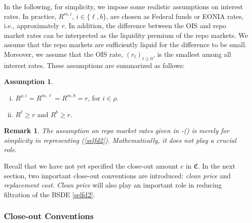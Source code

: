 \documentclass[a4paper, 11pt]{article}              %
\numberwithin{equation}{section}
\theoremstyle{plain}
\newcommand{\1}{\mathds{1}}
\newcommand{\frC}{\mathfrak{C}}
\theoremstyle{plain}
\newtheorem{assumption}[thm]{Assumption}
\theoremstyle{definition}
\newtheorem{remark}[thm]{Remark} %
\newtheorem{assumption}{Assumption}
\theoremstyle{plain}
\newtheorem{remark}{Remark}
\newcommand{\rom}[1]{\lowercase\expandafter{\romannumeral #1\relax}}
\begin{document}
In the following, for simplicity, we impose some realistic assumptions on
interest rates. In practice, $R^{m, i}$, $i \in \{\ell, b\}$, are chosen as Federal
funds or EONIA rates, i.e., approximately $r$. In addition, the difference between the
OIS
and repo market rates can be interpreted as the liquidity premium of the repo
markets.  We assume that the repo markets are sufficiently liquid for the difference to be
small. Moreover, we assume that the OIS rate, $(r_t)_{t\geq0}$, is the smallest among
all interest rates. 
These assumptions are summarized as follows:
\begin{assumption}\label{assm:rate.exo}
\begin{enumerate}[(i)]
\item $R^{\rho, i} = R^{m, \ell} =R^{m, b}= r$, for $i \in \rho$.
\item $R^\ell \geq r$ and $R^b\geq r$.
\end{enumerate}
\end{assumption}
\begin{remark}
The assumption on repo market rates given in -(\rom{1}) is  
merely for simplicity in representing (\ref{selfd2}). Mathematically, it does
not play a  crucial role.
\end{remark}
Recall that we have not yet specified the close-out amount $e$ in
$\frC$. In the next section, two important close-out conventions are introduced:
\textit{clean price} and \textit{replacement cost}. \textit{Clean price} will
also play an important role in reducing filtration of the BSDE \cref{selfd2}.
\subsubsection{Close-out Conventions}
% 
\iffalse
\label{sec:close}
The close-out amount is calculated by a determining party which will act in good
faith \citep{isda2009close}. As stated in \citet[p.15]{isda2009close}, ``the
Determining Party may consider any relevant information, including, without
limitation, one or more of the following types of information: quotations
(either firm or indicative) for replacement transactions supplied by one or more
third parties that may take into account the creditworthiness of the Determining
Party at the time the quotation is provided and the terms of any relevant
documentation \dots''. The statement leaves some rooms for interpretation. ISDA
recommends to consider creditworthiness of the surviving party, but it is not
mandatory. Moreover, it is unclear whether funding costs should be considered in
the replacement transaction.
\fi
\end{document}
